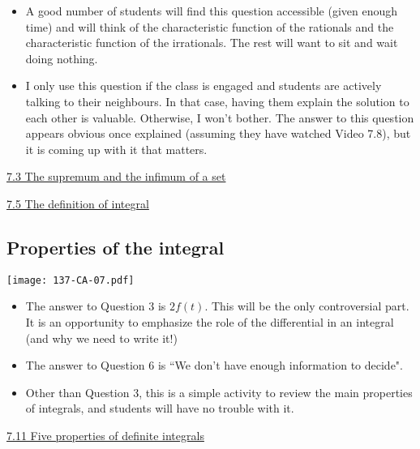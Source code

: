 \documentclass[11pt]{article}
\newcommand{\nl}{\hfill \vspace{-1.1\baselineskip}} %
\newcommand{\viii}{\hspace{8mm} \href{https://www.youtube.com/watch?v=4qNstDwlh9I&list=PLlwePzQY_wW9vqCkUudCmoOvnNmr9vMuJ&index=3}{7.3 The supremum and the infimum of a set}}
\newcommand{\vv}{\hspace{8mm} \href{https://www.youtube.com/watch?v=dZ_TWQbksbg&list=PLlwePzQY_wW9vqCkUudCmoOvnNmr9vMuJ&index=5}{7.5 The definition of integral}}
\newcommand{\vxi}{\hspace{8mm} \href{https://www.youtube.com/watch?v=Hco-2q2A_ss&list=PLlwePzQY_wW9vqCkUudCmoOvnNmr9vMuJ&index=11}{7.11 Five properties of definite integrals}}
\begin{document}
\begin{comments}
\nl
	\begin{itemize}
		\item A good number of students will find this question accessible (given enough time) and will think of the characteristic function of the rationals and the characteristic function of the irrationals.  The rest will want to sit and wait doing nothing.
		\item I only use this question if the class is engaged and students are actively  talking to their neighbours.  In that case, having them explain the solution to each other is valuable.  Otherwise, I won't bother.    The answer to this question appears obvious once explained (assuming they have watched Video 7.8), but it is coming up with it that matters.
	\end{itemize}
\end{comments}

\begin{videos}
\viii

\vv
\end{videos}

\newpage
\subsection{Properties of the integral}

\begin{center}
{ \texttt{[image: 137-CA-07.pdf]}} 
\end{center}

\begin{comments}
\nl
	\begin{itemize}
		\item The answer to Question 3 is $2f(t)$.  This will be the only controversial part.  It is an opportunity to emphasize the role of the differential in an integral (and why we need to write it!)
		\item The answer to Question 6 is ``We don't have enough information to decide".
		\item Other than Question 3, this is a simple activity to review the main properties of integrals, and students will have no trouble with it.
	\end{itemize}
\end{comments}

\begin{videos}
\vxi
\end{videos}
\end{document}
